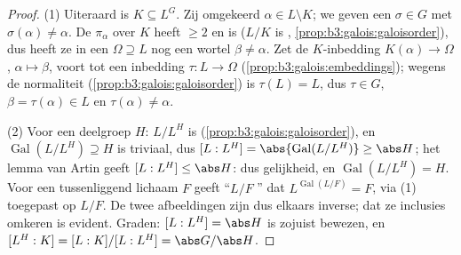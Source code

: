 \begin{proof}
(1) Uiteraard is $K \subseteq L^G$. Zij omgekeerd $\alpha \in L
\setminus K$; we geven een $\sigma \in G$ met $\sigma(\alpha) \ne
\alpha$. De  $\pi_\alpha$ over $K$ heeft 
$\geq 2$ en is  ($L/K$ is ,
\cref{prop:b3:galois:galoisorder}), dus heeft ze in een
 $\Omega \supseteq L$ nog een wortel $\beta
\neq \alpha$. Zet de $K$-inbedding $K(\alpha) \to \Omega$, $\alpha
\mapsto \beta$, voort tot een inbedding $\tau\colon L \to \Omega$
(\cref{prop:b3:galois:embeddings}); wegens de normaliteit
(\cref{prop:b3:galois:galoisorder}) is $\tau(L) = L$, dus $\tau
\in G$, $\beta = \tau(\alpha) \in L$ en $\tau(\alpha) \neq
\alpha$.

(2) Voor een deelgroep $H$: $L/L^H$ is 
(\cref{prop:b3:galois:galoisorder}), en $\operatorname{Gal}(L/L^H)
\supseteq H$ is triviaal, dus $[L:L^H] =
\abs{\operatorname{Gal}(L/L^H)} \geq \abs H$; het lemma van Artin
geeft $[L:L^H] \leq \abs H$: dus gelijkheid, en
$\operatorname{Gal}(L/L^H) = H$. Voor een tussenliggend lichaam
$F$ geeft ``$L/F$ '' dat $L^{\operatorname{Gal}(L/F)} = F$,
via (1) toegepast op $L/F$. De twee afbeeldingen zijn dus elkaars
inverse; dat ze inclusies omkeren is evident. Graden: $[L:L^H] =
\abs H$ is zojuist bewezen, en $[L^H:K] = [L:K]/[L:L^H] = \abs
G/\abs H$.


\end{proof}
